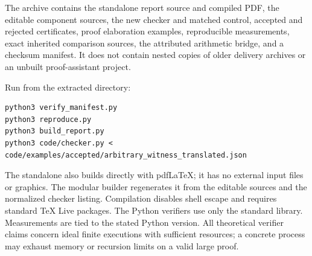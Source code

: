 The archive contains the standalone report source and compiled PDF, the
editable component sources, the new checker and matched control, accepted
and rejected certificates, proof elaboration examples, reproducible
measurements, exact inherited comparison sources, the attributed arithmetic
bridge, and a checksum manifest. It does not contain nested copies of older
delivery archives or an unbuilt proof-assistant project.

Run from the extracted directory:
\begin{lstlisting}[language={}]
python3 verify_manifest.py
python3 reproduce.py
python3 build_report.py
python3 code/checker.py < code/examples/accepted/arbitrary_witness_translated.json
\end{lstlisting}
The standalone  also builds directly
with pdfLaTeX; it has no external input files or graphics. The modular builder
regenerates it from the editable sources and the normalized checker listing.
Compilation disables shell escape and requires standard TeX Live packages.
The Python verifiers use only the standard library. Measurements are tied to
the stated Python version. All theoretical verifier claims concern ideal
finite executions with sufficient resources; a concrete process may exhaust
memory or recursion limits on a valid large proof.

